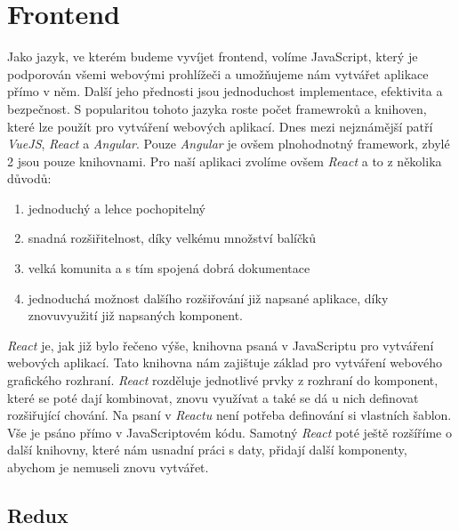 \section{Frontend}

Jako jazyk, ve kterém budeme vyvíjet frontend, volíme JavaScript, který je podporován všemi webovými prohlížeči a umožňujeme nám vytvářet aplikace
přímo v něm. Další jeho přednosti jsou jednoduchost implementace, efektivita a bezpečnost. S popularitou tohoto jazyka roste počet framewroků a knihoven,
které lze použít pro vytváření webových aplikací. Dnes mezi nejznámější patří \textit{VueJS}, \textit{React} a \textit{Angular}. Pouze \textit{Angular} je ovšem plnohodnotný framework, zbylé
2 jsou pouze knihovnami. \cite{jsComparasion} Pro naší aplikaci zvolíme ovšem \textit{React} a to z několika důvodů:
\begin{enumerate}
    \item jednoduchý a lehce pochopitelný
    \item snadná rozšiřitelnost, díky velkému množství balíčků
    \item velká komunita a s tím spojená dobrá dokumentace
    \item jednoduchá možnost dalšího rozšiřování již napsané aplikace, díky znovuvyužití již napsaných komponent.
\end{enumerate}

\textit{React} je, jak již bylo řečeno výše, knihovna psaná v JavaScriptu pro vytvá\-ření webových aplikací. Tato knihovna nám zajištuje základ pro vytváření webového grafického rozhraní.
\textit{React} rozděluje
jednotlivé prvky z rozhraní do komponent, které se poté dají kombinovat, znovu využívat a také se dá u nich definovat rozšiřující chování. Na psaní v \textit{Reactu} není potřeba
definování
si vlastních šablon. Vše je psáno přímo v JavaScriptovém kódu. \cite{reactJS} Samotný \textit{React} poté ještě rozšíříme o další knihovny, které nám usnadní práci s daty, přidají
další komponenty, abychom je nemuseli znovu vytvářet.

\subsection{Redux}

